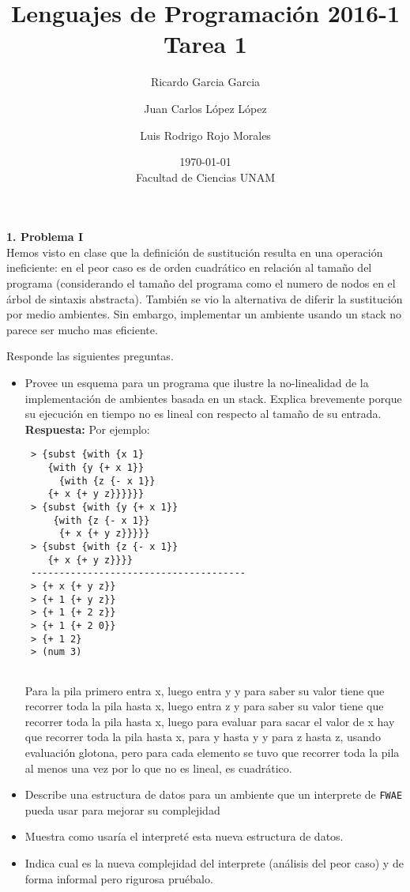 \documentclass[letterpaper,11pt]{article}
\title{Lenguajes de Programación 2016-1\\Tarea 1}
\author{Ricardo Garcia Garcia \and  Juan Carlos López López \and Luis Rodrigo Rojo Morales}
\date{\today\\ Facultad de Ciencias UNAM}
\begin{document}
 
 \maketitle
 
 {\bf 1. Problema I}
 \\
 Hemos visto en clase que la definición de sustitución resulta en una operación ineficiente: en el peor caso es de orden cuadrático en relación al tamaño del programa (considerando el tamaño del programa como el numero de nodos en el árbol de sintaxis abstracta). También se vio la alternativa de diferir la sustitución por medio ambientes. Sin embargo, implementar un ambiente usando un stack no parece ser mucho mas eficiente.

 Responde las siguientes preguntas.
 \begin{itemize}
 \item Provee un esquema para un programa que ilustre la no-linealidad de la implementación de ambientes basada en un stack. Explica brevemente porque su ejecución en tiempo no es lineal con respecto al tamaño de su entrada.
 \\
 \textbf{Respuesta:} 
 Por ejemplo:
 
 \begin{verbatim}
 > {subst {with {x 1}
    {with {y {+ x 1}}
      {with {z {- x 1}}
	{+ x {+ y z}}}}}}
 > {subst {with {y {+ x 1}}
     {with {z {- x 1}}
      {+ x {+ y z}}}}}
 > {subst {with {z {- x 1}}
    {+ x {+ y z}}}}
 --------------------------------------
 > {+ x {+ y z}}
 > {+ 1 {+ y z}}
 > {+ 1 {+ 2 z}}
 > {+ 1 {+ 2 0}}
 > {+ 1 2}
 > (num 3)
 
 \end{verbatim}

 
 Para la pila primero entra x, luego entra y y para saber su valor tiene que recorrer toda la pila hasta x, luego entra z
 y para saber su valor tiene que recorrer toda la pila hasta x, luego para evaluar para sacar el valor de x hay que recorrer
 toda la pila hasta x, para y hasta y y para z hasta z, usando evaluación glotona, pero para cada elemento se tuvo que recorrer
 toda la pila al menos una vez por lo que no es lineal, es cuadrático.
 
 \item Describe una estructura de datos para un ambiente que un interprete de \texttt{FWAE} pueda usar para mejorar su complejidad
 \item Muestra como usaría el interpreté esta nueva estructura de datos.
 \item Indica cual es la nueva complejidad del interprete (análisis del peor caso) y de forma informal pero rigurosa pruébalo.
 \end{itemize}
 
\end{document}
